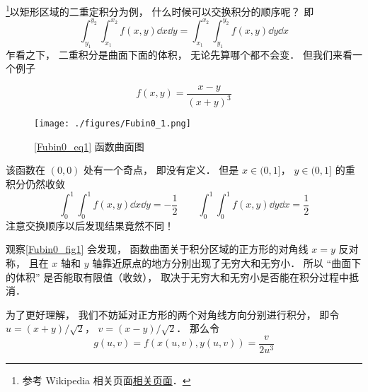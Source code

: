 

\footnote{参考 Wikipedia 相关页面\href{https://en.wikipedia.org/wiki/Fubini's_theorem}{相关页面}．}以矩形区域的二重定积分为例， 什么时候可以交换积分的顺序呢？ 即
\begin{equation}
\int_{y_1}^{y_2}\int_{x_1}^{x_2} f(x, y) \dd{x} \dd{y} = \int_{x_1}^{x_2}\int_{y_1}^{y_2} f(x, y) \dd{y}\dd{x}
\end{equation}
乍看之下， 二重积分是曲面下面的体积， 无论先算哪个都不会变． 但我们来看一个例子

\begin{example}{}
\begin{equation}\label{Fubin0_eq1}
f(x, y) = \frac{x - y}{(x+y)^3}
\end{equation}
\begin{figure}[ht]
\centering
\texttt{[image: ./figures/Fubin0\_1.png]}
\caption{\autoref{Fubin0_eq1} 函数曲面图} \label{Fubin0_fig1}
\end{figure}
该函数在 $(0,0)$ 处有一个奇点， 即没有定义． 但是 $x \in (0, 1]$， $y \in (0, 1]$ 的重积分仍然收敛
\begin{equation}
\int_0^1 \int_0^1 f(x,y) \dd{x} \dd{y} = -\frac{1}{2}
\qquad
\int_0^1 \int_0^1 f(x,y) \dd{y} \dd{x} = \frac{1}{2}
\end{equation}
注意交换顺序以后发现结果竟然不同！

观察\autoref{Fubin0_fig1} 会发现， 函数曲面关于积分区域的正方形的对角线 $x=y$ 反对称， 且在 $x$ 轴和 $y$ 轴靠近原点的地方分别出现了无穷大和无穷小． 所以 “曲面下的体积” 是否能取有限值（收敛）， 取决于无穷大和无穷小是否能在积分过程中抵消．

为了更好理解， 我们不妨延对正方形的两个对角线方向分别进行积分， 即令 $u = (x+y)/\sqrt{2}$， $v=(x-y)/\sqrt{2}$． 那么令
\begin{equation}
g(u,v) = f(x(u,v), y(u,v)) = \frac{v}{2u^3}
\end{equation}


\end{example}
